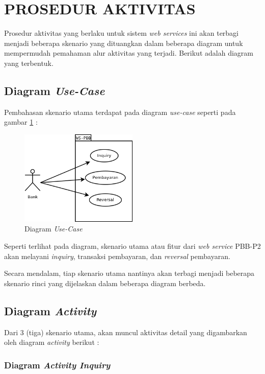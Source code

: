 \documentclass[pdftex,12pt, oneside]{article}
\begin{document}
\section{PROSEDUR AKTIVITAS}

Prosedur aktivitas yang berlaku untuk sistem \textit{web services} ini akan terbagi menjadi beberapa skenario yang dituangkan dalam beberapa diagram untuk mempermudah pemahaman alur aktivitas yang terjadi. Berikut adalah diagram yang terbentuk.

\subsection{Diagram \textit{Use-Case}}

Pembahasan skenario utama terdapat pada diagram \textit{use-case} seperti pada gambar \ref{fig:uml-use-case} :

\begin{figure}[H]
  \centering
  \includegraphics[width=0.5\textwidth]{./resources/diagram/uml-use-case}
  \caption{Diagram \textit{Use-Case}}
  \label{fig:uml-use-case}
\end{figure}

Seperti terlihat pada diagram, skenario utama atau fitur dari \textit{web service} PBB-P2 akan melayani \textit{inquiry}, transaksi pembayaran, dan \textit{reversal} pembayaran.

Secara mendalam, tiap skenario utama nantinya akan terbagi menjadi beberapa skenario rinci yang dijelaskan dalam beberapa diagram berbeda.

\subsection{Diagram \textit{Activity}}

Dari 3 (tiga) skenario utama, akan muncul aktivitas detail yang digambarkan oleh diagram \textit{activity} berikut :

\subsubsection{Diagram \textit{Activity Inquiry}}
\end{document}
